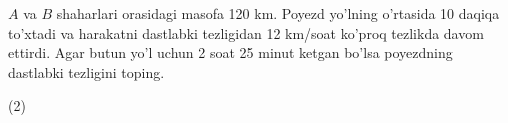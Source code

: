 \documentclass[14pt]{article}
\begin{document}
\begin{taskbox}
\(A\) va \(B\) shaharlari orasidagi masofa 120 km. Poyezd yo'lning o'rtasida 10 daqiqa to'xtadi va harakatni dastlabki tezligidan 12 km/soat ko'proq tezlikda davom ettirdi. Agar butun yo'l uchun 2 soat 25 minut ketgan bo'lsa poyezdning dastlabki tezligini toping.

\vspace{0.2cm} \begin{tasks}(2) %
\end{tasks}
\vspace{2cm}
\end{taskbox}
\end{document}
